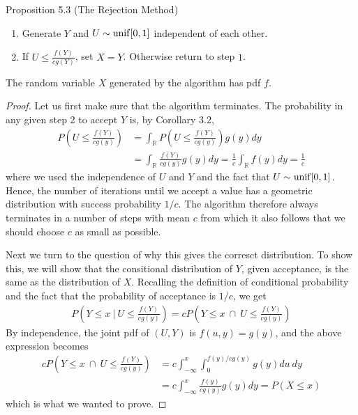\begin{boks}{Proposition 5.3 (The Rejection Method)}
  \begin{enumerate}[label = \arabic*.]
    \item Generate $Y$ and $U \sim \operatorname{unif}[0,1]$ independent of each other.
    \item If $U \leq \frac{f(Y)}{cg(Y)}$, set $X = Y$. Otherwise return to step $1$.
  \end{enumerate}
  The random variable $X$ generated by the algorithm has pdf $f$.
\end{boks}
\begin{proof}
  Let us first make sure that the algorithm terminates. The probability in any given step 2 to accept $Y$ is, by Corollary 3.2,
  \begin{align*}
    P\left( U \leq \frac{f(Y)}{cg(y)} \right) &=
    \int_{\mathbb{R}} P\left( U \leq \frac{f(Y)}{cg(y)} \right) g(y)dy \\
    &= \int_{\mathbb{R}} \frac{f(Y)}{cg(y)} g(y)dy =
    \frac{1}{c}\int_\mathbb{R}f(y)dy =
    \frac{1}{c}
  \end{align*}
  where we used the independence of $U$ and $Y$ and the fact that $U \sim \operatorname{unif}[0,1]$. Hence, the number of iterations until we accept a value has a geometric distribution with success probability $1/c$. The algorithm therefore always terminates in a number of steps with mean $c$ from which it also follows that we should choose $c$ as small as possible.

  Next we turn to the question of why this gives the corresct distribution. To show this, we will show that the consitional distribution of $Y$, given acceptance, is the same as the distribution of $X$. Recalling the definition of conditional probability and the fact that the probability of acceptance is $1/c$, we get
  \begin{align*}
    P\left(Y \leq x \ \bigg| \ U \leq \frac{f(Y)}{cg(y)} \right) =
    cP\left(Y \leq x \ \cap \ U \leq \frac{f(Y)}{cg(y)}\right)
  \end{align*}
  By independence, the joint pdf of $(U, Y)$ is $f(u,y) = g(y)$, and the above expression becomes
  \begin{align*}
    cP\left(Y \leq x \ \cap \ U \leq \frac{f(Y)}{cg(y)}\right) &= c \int_{-\infty}^x \int_0^{f(y)/cg(y)} g(y)du \ dy \\
    &= c \int_{-\infty}^x \frac{f(y)}{cg(y)}g(y)dy = P(X \leq x)
  \end{align*}
  which is what we wanted to prove.
\end{proof}
